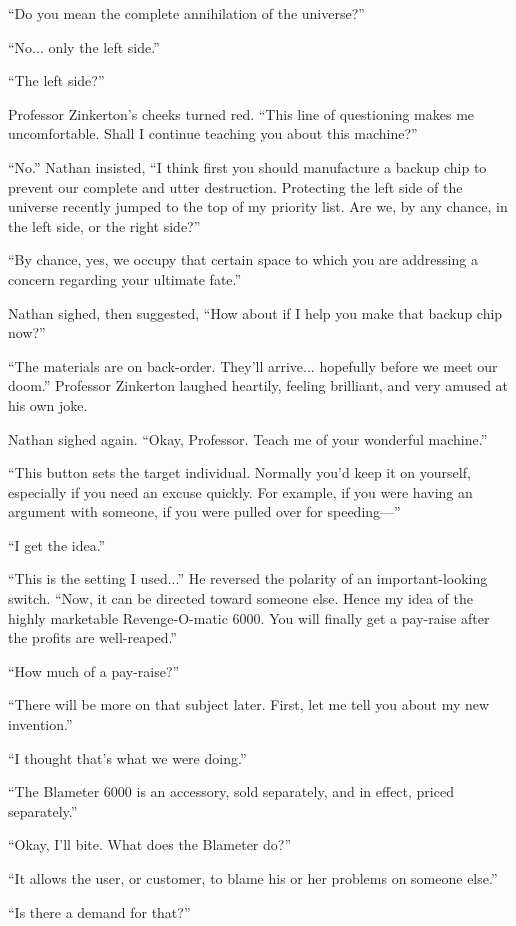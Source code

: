 “Do you mean the complete annihilation of the universe?”

“No... only the left side.”

“The left side?”

Professor Zinkerton's cheeks turned red. “This line of questioning makes me uncomfortable. Shall I continue teaching you about this machine?”

“No.” Nathan insisted, “I think first you should manufacture a backup chip to prevent our complete and utter destruction. Protecting the left side of the universe recently jumped to the top of my priority list. Are we, by any chance, in the left side, or the right side?”

“By chance, yes, we occupy that certain space to which you are addressing a concern regarding your ultimate fate.”

Nathan sighed, then suggested, “How about if I help you make that backup chip now?”

“The materials are on back-order. They'll arrive... hopefully before we meet our doom.” Professor Zinkerton laughed heartily, feeling brilliant, and very amused at his own joke.

Nathan sighed again. “Okay, Professor. Teach me of your wonderful machine.”

“This button sets the target individual. Normally you'd keep it on yourself, especially if you need an excuse quickly. For example, if you were having an argument with someone, if you were pulled over for speeding—”

“I get the idea.”

“This is the setting I used...” He reversed the polarity of an important-looking switch. “Now, it can be directed toward someone else. Hence my idea of the highly marketable Revenge-O-matic 6000. You will finally get a pay-raise after the profits are well-reaped.”

“How much of a pay-raise?”

“There will be more on that subject later. First, let me tell you about my new invention.”

“I thought that's what we were doing.”

“The Blameter 6000 is an accessory, sold separately, and in effect, priced separately.”

“Okay, I'll bite. What does the Blameter do?”

“It allows the user, or customer, to blame his or her problems on someone else.”

“Is there a demand for that?”

